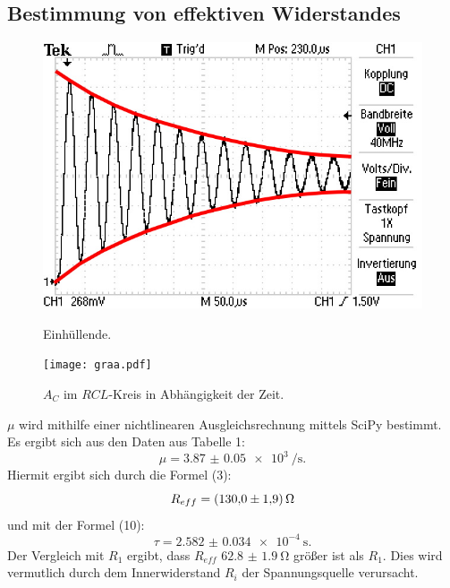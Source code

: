 \subsection{Bestimmung von effektiven Widerstandes}
\begin{figure}[H]
	\centering
	\caption{Einhüllende.}
	\includegraphics[width=\linewidth-70pt,height=\textheight-70pt,keepaspectratio]{content/Einhuellende.JPG}
	\label{fig:graein}
\end{figure}
\begin{figure}[H]
	\centering
	\caption{$A_C$ im $RCL$-Kreis in Abhängigkeit der Zeit.}
	\texttt{[image: graa.pdf]}
	\label{fig:graa}
\end{figure}

$\mu$ wird mithilfe einer nichtlinearen Ausgleichsrechnung mittels SciPy \cite{scipy} bestimmt. Es ergibt sich aus den Daten aus Tabelle 1:
\begin{displaymath}
\mu = \SI{3.87(5)e3}{\per\second}\text{.}
\end{displaymath}
Hiermit ergibt sich durch die Formel (3):
\begin{displaymath}
R_{eff} = \SI{130 \pm 1.9}{\ohm}
\end{displaymath}
und mit der Formel (10):
\begin{displaymath}
\tau = \SI{2.582(34)e-4}{\second}\text{.}
\end{displaymath}
Der Vergleich mit $R_1$ ergibt, dass $R_{eff}$ $\SI{62.8(19)}{\ohm}$ größer ist als $R_1$. Dies wird vermutlich durch dem Innerwiderstand $R_i$ der Spannungsquelle verursacht.

